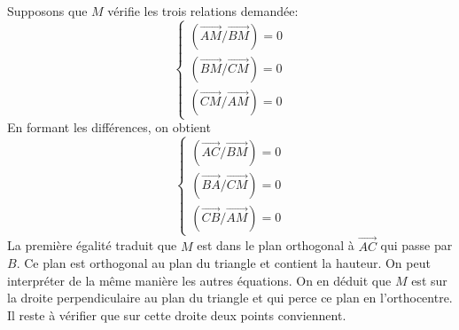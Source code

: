 Supposons que $M$ vérifie les trois relations demandée:
\begin{displaymath}
 \left\lbrace 
\begin{aligned}
 (\overrightarrow{AM}/\overrightarrow{BM})=0 \\
 (\overrightarrow{BM}/\overrightarrow{CM})=0 \\
 (\overrightarrow{CM}/\overrightarrow{AM})=0 
\end{aligned}
\right. 
\end{displaymath}
En formant les différences, on obtient
\begin{displaymath}
 \left\lbrace 
\begin{aligned}
 (\overrightarrow{AC}/\overrightarrow{BM})=0 \\
 (\overrightarrow{BA}/\overrightarrow{CM})=0 \\
 (\overrightarrow{CB}/\overrightarrow{AM})=0 
\end{aligned}
\right. 
\end{displaymath}
La première égalité traduit que $M$ est dans le plan orthogonal à $\overrightarrow{AC}$ qui passe par $B$. Ce plan est orthogonal au plan du triangle et contient la hauteur. On peut interpréter de la même manière les autres équations. On en déduit que $M$ est sur la droite perpendiculaire au plan du triangle et qui perce ce plan en l'orthocentre. Il reste à vérifier que sur cette droite deux points conviennent.